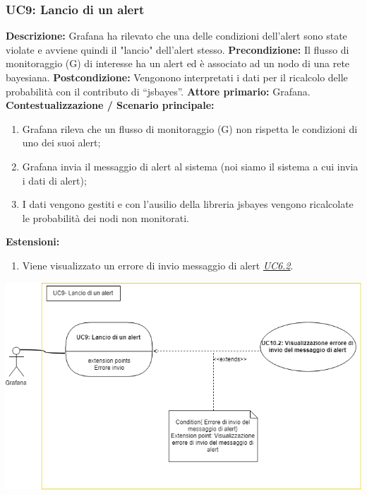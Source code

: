 		        \subsubsection{UC9: Lancio di un alert}
                    \textbf{Descrizione:} Grafana ha rilevato che una delle condizioni dell'alert sono state violate e avviene quindi il "lancio" dell'alert stesso.
                    \newline
                    \textbf{Precondizione:} Il flusso di monitoraggio (G) di interesse ha un alert ed è associato ad un nodo di una rete bayesiana.
                    \newline
                    \textbf{Postcondizione:} Vengonono interpretati i dati per il ricalcolo delle probabilità con il contributo di “jsbayes”.
                    \newline
                    \textbf{Attore primario:} Grafana.
                    \newline
                    \textbf{Contestualizzazione / Scenario principale:} \begin{enumerate}
                            \item Grafana rileva che un flusso di monitoraggio (G) non rispetta le condizioni di uno dei suoi alert;
                            \item Grafana invia il messaggio di alert al sistema (noi siamo il sistema a cui invia i dati di alert);
                            \item I dati vengono gestiti e con l’ausilio della libreria jsbayes vengono ricalcolate le probabilità dei nodi non monitorati.
                        \end{enumerate}
                    
                    \textbf{Estensioni:} 
                    \begin{enumerate}
                            \item Viene visualizzato un errore di invio messaggio di alert \underline{\textit{UC6.2}}.
                        \end{enumerate}
                        
                \includegraphics[width=\textwidth]{UC9.png}
                        
